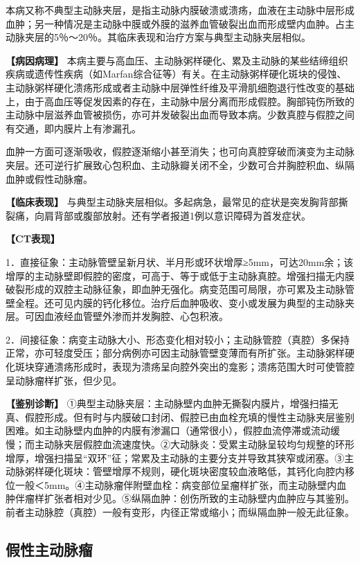 本病又称不典型主动脉夹层，是指主动脉内膜破溃或溃疡，血液在主动脉中层形成血肿；另一种情况是主动脉中膜或外膜的滋养血管破裂出血而形成壁内血肿。占主动脉夹层的5％～20％。其临床表现和治疗方案与典型主动脉夹层相似。

\textbf{【病因病理】}
本病主要与高血压、主动脉粥样硬化、累及主动脉的某些结缔组织疾病或遗传性疾病（如Marfan综合征等）有关。在主动脉粥样硬化斑块的侵蚀、主动脉粥样硬化溃疡形成或者主动脉中层弹性纤维及平滑肌细胞退行性改变的基础上，由于高血压等促发因素的存在，主动脉中层分离而形成假腔。胸部钝伤所致的主动脉中层滋养血管被损伤，亦可并发破裂出血而导致本病。少数真腔与假腔之间有交通，即内膜片上有渗漏孔。

血肿一方面可逐渐吸收，假腔逐渐缩小甚至消失；也可向真腔穿破而演变为主动脉夹层。还可逆行扩展致心包积血、主动脉瓣关闭不全，少数可合并胸腔积血、纵隔血肿或假性动脉瘤。

\textbf{【临床表现】}
与典型主动脉夹层相似。多起病急，最常见的症状是突发胸背部撕裂痛，向肩背部或腹部放射。还有学者报道1例以意识障碍为首发症状。

\textbf{【CT表现】}

1．直接征象：主动脉管壁呈新月状、半月形或环状增厚≥5mm，可达20mm余；该增厚的主动脉壁即假腔的密度，可高于、等于或低于主动脉真腔。增强扫描无内膜破裂形成的双腔主动脉征象，即血肿无强化。病变范围可局限，亦可累及主动脉管壁全程。还可见内膜的钙化移位。治疗后血肿吸收、变小或发展为典型的主动脉夹层。可因血液经血管壁外渗而并发胸腔、心包积液。

2．间接征象：病变主动脉大小、形态变化相对较小；主动脉管腔（真腔）多保持正常，亦可轻度受压；部分病例亦可因主动脉管壁变薄而有所扩张。主动脉粥样硬化斑块穿通溃疡形成时，表现为溃疡呈向腔外突出的龛影；溃疡范围大时可使管腔呈动脉瘤样扩张，但少见。

\textbf{【鉴别诊断】}
①典型主动脉夹层：主动脉壁内血肿无撕裂内膜片，增强扫描无真、假腔形成。但有时与内膜破口封闭、假腔已由血栓充填的慢性主动脉夹层鉴别困难。如主动脉壁内血肿的内膜有渗漏口（通常很小），假腔血流停滞或流动缓慢；而主动脉夹层假腔血流速度快。②大动脉炎：受累主动脉呈较均匀规整的环形增厚，增强扫描呈“双环”征；常累及主动脉的主要分支并导致其狭窄或闭塞。③主动脉粥样硬化斑块：管壁增厚不规则，硬化斑块密度较血液略低，其钙化向腔内移位一般＜5mm。④主动脉瘤伴附壁血栓：病变部位呈瘤样扩张，而主动脉壁内血肿伴瘤样扩张者相对少见。⑤纵隔血肿：创伤所致的主动脉壁内血肿应与其鉴别。前者主动脉腔（真腔）一般有变形，内径正常或缩小；而纵隔血肿一般无此征象。

\subsection{假性主动脉瘤}

